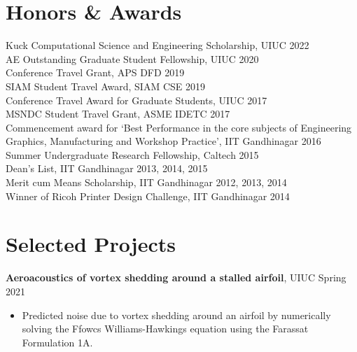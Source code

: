 \documentclass[margin]{res}
\begin{document}
\begin{resume}
\section{\large Honors \& Awards}
Kuck Computational Science and Engineering Scholarship, UIUC \hfill 2022\vspace{0.1cm}\\
AE Outstanding Graduate Student Fellowship, UIUC \hfill 2020\vspace{0.1cm}\\
Conference Travel Grant, APS DFD \hfill 2019\vspace{0.1cm}\\
SIAM Student Travel Award, SIAM CSE \hfill 2019\vspace{0.1cm}\\
Conference Travel Award for Graduate Students, UIUC \hfill 2017\vspace{0.1cm}\\
MSNDC Student Travel Grant, ASME IDETC \hfill 2017\vspace{0.1cm}\\
Commencement award for `Best Performance in the core subjects of Engineering Graphics, Manufacturing and Workshop Practice', IIT Gandhinagar \hfill 2016\vspace{0.1cm}\\
Summer Undergraduate Research Fellowship, Caltech \hfill 2015\vspace{0.1cm}\\
Dean's List, IIT Gandhinagar \hfill 2013, 2014, 2015\vspace{0.1cm}\\
Merit cum Means Scholarship, IIT Gandhinagar \hfill 2012, 2013, 2014\vspace{0.1cm}\\
Winner of Ricoh Printer Design Challenge, IIT Gandhinagar \hfill 2014


\section{\large Selected Projects}

{\bf Aeroacoustics of vortex shedding around a stalled airfoil}, UIUC \hfill Spring 2021
\begin{itemize}
\item Predicted noise due to vortex shedding around an airfoil by numerically solving the Ffowcs Williams-Hawkings equation using the Farassat Formulation 1A.
\end{itemize}


\end{resume}
\end{document}
